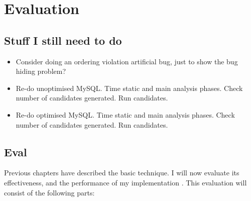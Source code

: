 \chapter{Evaluation}
\label{chapter:eval}

\section{Stuff I still need to do}

\begin{itemize}
\item Consider doing an ordering violation artificial bug, just to
  show the bug hiding problem?
\item Re-do unoptimised MySQL.  Time static and main analysis phases.
  Check number of candidates generated.  Run candidates.
\item Re-do optimised MySQL.  Time static and main analysis phases.
  Check number of candidates generated.  Run candidates.
\end{itemize}

\section{Eval}

Previous chapters have described the basic {\technique} technique.  I
will now evaluate its effectiveness, and the performance of my
implementation {\implementation}.  This evaluation will consist of the
following parts:

